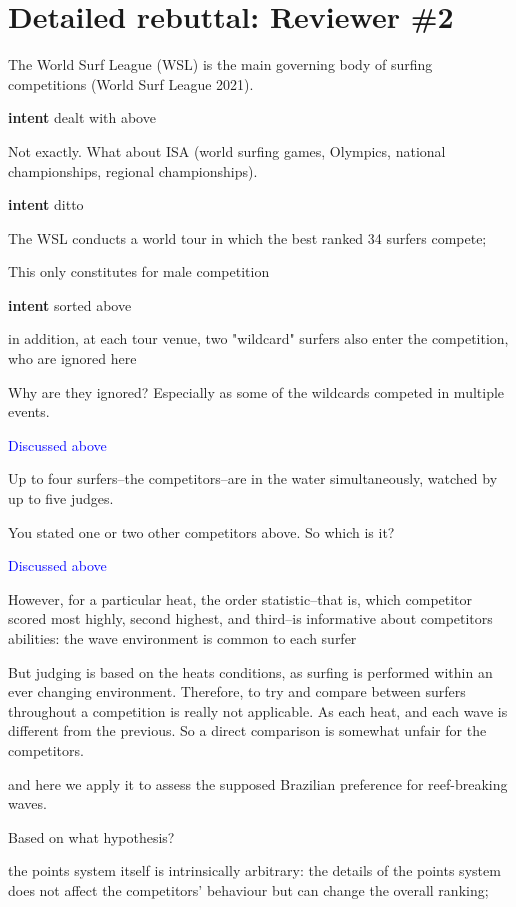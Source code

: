 \documentclass[12pt]{article}
\begin{document}
\section*{Detailed rebuttal: Reviewer \#2}


The World Surf League (WSL) is the main governing
body of surfing competitions (World Surf League 2021).

{\bf intent}  dealt with above

Not exactly. What about ISA (world surfing games, Olympics, national
championships, regional championships).

{\bf intent}  ditto


The WSL conducts a
world tour in which the best ranked 34 surfers compete;

This only constitutes for male competition

{\bf intent}  sorted above

in addition, at each tour venue, two "wildcard" surfers also enter the
competition, who are ignored here

Why are they ignored? Especially as some of the wildcards competed in multiple events.

\textcolor{blue}{Discussed above}





Up to four surfers--the competitors--are in the water simultaneously,
watched by up to five judges.

You stated one or two other competitors above. So which is it?

\textcolor{blue}{Discussed above}


However, for a particular heat, the order statistic--that is, which
competitor scored most highly, second highest, and third--is
informative about competitors abilities: the wave environment is
common to each surfer

But judging is based on the heats conditions, as surfing is performed
within an ever changing environment. Therefore, to try and compare
between surfers throughout a competition is really not applicable. As
each heat, and each wave is different from the previous. So a direct
comparison is somewhat unfair for the competitors.



and here we apply it to assess the supposed Brazilian preference for
reef-breaking waves.

Based on what hypothesis?


the points system itself is intrinsically arbitrary: the details of
the points system does not affect the competitors' behaviour but can
change the overall ranking;
\end{document}
